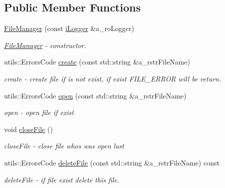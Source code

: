 \subsection*{Public Member Functions}
\begin{DoxyCompactItemize}
\item 
\mbox{\hyperlink{classhelper_1_1_file_manager_ad4d27bd875ae06a87736bd04cab9539b}{File\+Manager}} (const \mbox{\hyperlink{classi_logger}{i\+Logger}} \&a\+\_\+ro\+Logger)
\begin{DoxyCompactList}\small\item\em \mbox{\hyperlink{classhelper_1_1_file_manager}{File\+Manager}} -\/ constructor. \end{DoxyCompactList}\item 
utils\+::\+Errors\+Code \mbox{\hyperlink{classhelper_1_1_file_manager_ab36cf64cb374f9d4f72d7490c18f9891}{create}} (const std\+::string \&a\+\_\+rstr\+File\+Name)
\begin{DoxyCompactList}\small\item\em create -\/ create file if is not exist, if exist F\+I\+L\+E\+\_\+\+E\+R\+R\+OR will be return. \end{DoxyCompactList}\item 
utils\+::\+Errors\+Code \mbox{\hyperlink{classhelper_1_1_file_manager_a0b4bac7ff95be0bdad0b70987a25b63c}{open}} (const std\+::string \&a\+\_\+rstr\+File\+Name)
\begin{DoxyCompactList}\small\item\em open -\/ open file if exist \end{DoxyCompactList}\item 
\mbox{\label{classhelper_1_1_file_manager_ab6927c952a504e279d95d3cde569874c}} 
void \mbox{\hyperlink{classhelper_1_1_file_manager_ab6927c952a504e279d95d3cde569874c}{close\+File}} ()
\begin{DoxyCompactList}\small\item\em close\+File -\/ close file whos was open last \end{DoxyCompactList}\item 
utils\+::\+Errors\+Code \mbox{\hyperlink{classhelper_1_1_file_manager_aa1bc4e046b1975d24ac2b8d575792692}{delete\+File}} (const std\+::string \&a\+\_\+rstr\+File\+Name) const
\begin{DoxyCompactList}\small\item\em delete\+File -\/ if file exist delete this file. \end{DoxyCompactList}\item 

\end{DoxyCompactItemize}
